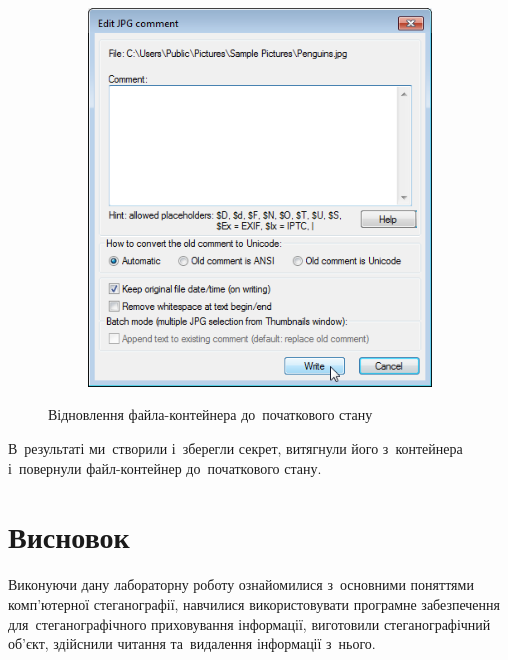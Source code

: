 \documentclass[
	a4paper,
	oneside,
	BCOR = 10mm,
	DIV = 12,
	12pt,
	headings = normal,
]{scrartcl}
\newlength{\gridunitwidth}
\begin{document}
\begin{figure}[!htbp]
\begin{subfigure}[b]{6 \gridunitwidth - 1em / (2-1)}
				\includegraphics[width = \columnwidth]{./assets/p17.png}
				\caption{}
				\label{subfig:image-comment-after}
			\end{subfigure}
			\caption{Відновлення файла-контейнера до~початкового стану}
			\label{fig:image-comment}
		\end{figure}

		В~результаті ми~створили і~зберегли секрет, витягнули його з~контейнера і~повернули файл-контейнер до~початкового стану.

	\section{Висновок}
		Виконуючи дану лабораторну роботу ознайомилися з~основними поняттями комп'ютерної стеганографії, навчилися використовувати програмне забезпечення для~стеганографічного приховування інформації, виготовили стеганографічний об’єкт, здійснили читання та~видалення інформації з~нього.
\end{document}

